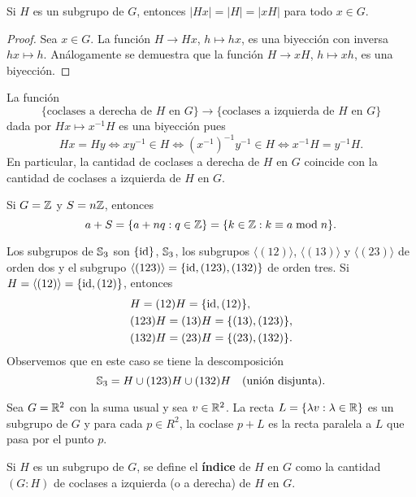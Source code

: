 \begin{proposition}
	Si $H$ es un subgrupo de $G$, entonces $|Hx|=|H|=|xH|$ para todo $x\in G$. 
\end{proposition}

\begin{proof}
	Sea $x\in G$. La función $H\to Hx$, $h\mapsto hx$, es una biyección con
	inversa $hx\mapsto h$. Análogamente se demuestra que la función $H\to xH$,
	$h\mapsto xh$, es una biyección. 
\end{proof}

La función
\[
	\{\text{coclases a derecha de $H$ en $G$}\}\to\{\text{coclases a izquierda de $H$ en $G$}\}
\]
dada por $Hx\mapsto x^{-1}H$ es una biyección pues 
\[
	Hx=Hy
	\Longleftrightarrow xy^{-1}\in H
	\Longleftrightarrow (x^{-1})^{-1}y^{-1}\in H
	\Longleftrightarrow x^{-1}H=y^{-1}H.
\]
En particular, la cantidad de coclases a derecha de $H$ en $G$ coincide con la
cantidad de coclases a izquierda de $H$ en $G$.

\begin{example}
Si $G=\mathbb{Z}$ y $S=n\mathbb{Z}$, entonces
\[
a+S=\{a+nq:q\in\mathbb{Z}\}=\{k\in\mathbb{Z}:k\equiv a\bmod n\}.
\]	
\end{example}

\begin{example}
Los subgrupos de $\mathbb{S}_3$ son $\{\operatorname{id}\}$, $\mathbb{S}_3$, los subgrupos $\langle(12)\rangle$, $\langle(13)\rangle$ y $\langle(23)\rangle$ de orden dos 
y el subgrupo $\langle(123)\rangle=\{\operatorname{id},(123),(132)\}$ de orden tres.  	Si $H=\langle(12)\rangle=\{\operatorname{id},(12)\}$, entonces
\begin{align*}
&H=(12)H=\{\operatorname{id},(12)\},\\
&(123)H=(13)H=\{(13),(123)\},\\
&(132)H=(23)H=\{(23),(132)\}.
\end{align*}
Observemos que en este caso se tiene la descomposición
\[
\mathbb{S}_3=H\cup (123)H\cup (132)H\quad\text{(unión disjunta)}.
\]
\end{example}

\begin{example}
Sea $G=\mathbb{R}^2$ con la suma usual y sea $v\in\mathbb{R}^2$. La recta $L=\{\lambda v:\lambda\in\mathbb{R}\}$ es un subgrupo de $G$ y 
para cada $p\in R^2$, la coclase $p+L$ es la recta paralela a $L$ que pasa por el punto $p$.  	
\end{example}


\begin{definition}
	Si $H$ es un subgrupo de $G$, se define el \textbf{índice} de $H$ en $G$
	como la cantidad $(G:H)$ de coclases a izquierda (o a derecha) de $H$ en $G$. 
\end{definition}

